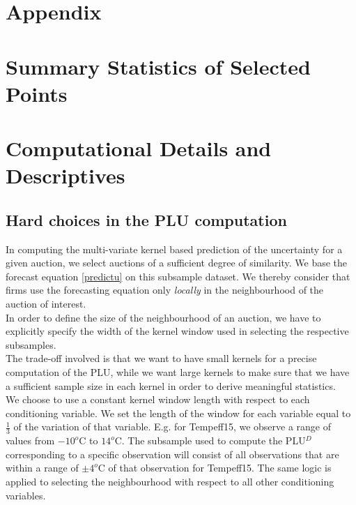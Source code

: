 \newpage
\begin{subappendices}
\section*{Appendix}

 \section{Summary Statistics of Selected Points}
\label{tablestomatch}








\section{Computational Details and Descriptives}
\subsection{Hard choices in the PLU computation}
\label{hardchoicePLU}

In computing the multi-variate kernel based prediction of the uncertainty for a given auction, we select auctions of a sufficient degree of similarity. We base the forecast equation \ref{predictu} on this subsample dataset. We thereby consider that firms use the forecasting equation only \textit{locally} in the neighbourhood of the auction of interest. \\

In order to define the size of the neighbourhood of an auction, we have to explicitly specify the width of the kernel window used in selecting the respective subsamples. \\

The trade-off involved is that we want to have small kernels for a precise computation of the PLU, while we want large kernels to make sure that we have a sufficient sample size in each kernel in order to derive meaningful statistics. \\

We choose to use a constant kernel window length with respect to each conditioning variable. We set the length of the window for each variable equal to $\frac{1}{3}$ of the variation of that variable. E.g. for Tempeff15, we observe a range of values from $-10^o$C to $14^o$C. The subsample used to compute the PLU$^D$ corresponding to a specific observation will consist of all observations that are within a range of $\pm 4^o$C of that observation for Tempeff15. The same logic is applied to selecting the neighbourhood with respect to all other conditioning variables. \\


\end{subappendices}
